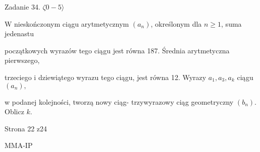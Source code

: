 \documentclass[a4paper,12pt]{article}
\begin{document}
Zadanie 34. $\zeta 0-5\rangle$

$\mathrm{W}$ nieskończonym ciągu arytmetycznym $(a_{n})$, określonym dla $n\geq 1$, suma jedenastu

początkowych wyrazów tego ciągu jest równa 187. Średnia arytmetyczna pierwszego,

trzeciego i dziewiątego wyrazu tego ciągu, jest równa 12. Wyrazy $a_{1}, a_{3}, a_{k}$ ciągu $(a_{n}),$

w podanej kolejności, tworzą nowy ciąg- trzywyrazowy ciąg geometryczny $(b_{n})$. Oblicz $k.$

Strona 22 z24

MMA-IP
\end{document}
